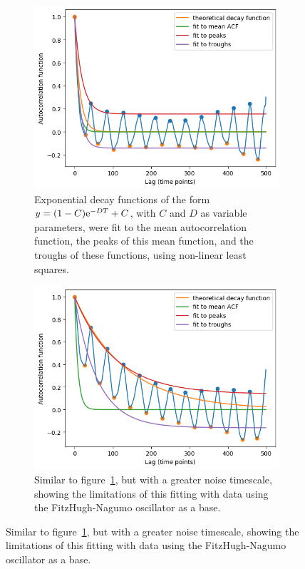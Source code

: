 \begin{figure}
  \centering
  \begin{subfigure}[t]{0.45\textwidth}
  \centering
    \includegraphics[width=\linewidth]{fhn_expofit}
    \caption{
      Exponential decay functions of the form $y = (1-C)\mathrm{e}^{-DT}+C$, with $C$ and $D$ as variable parameters, were fit to the mean autocorrelation function, the peaks of this mean function, and the troughs of these functions, using non-linear least squares.
    }
    \label{fig:acf-fhn-noiseparams-fit}
  \end{subfigure}%
  \begin{subfigure}[t]{0.45\textwidth}
  \centering
    \includegraphics[width=\linewidth]{fhn_highnts_expofit}
    \caption{
      Similar to figure~\ref{fig:acf-fhn-noiseparams-fit}, but with a greater noise timescale, showing the limitations of this fitting with data using the FitzHugh-Nagumo oscillator as a base.
    }
    \label{fig:acf-fhn-noiseparams-fit-highnts}
  \end{subfigure}


\end{figure}
